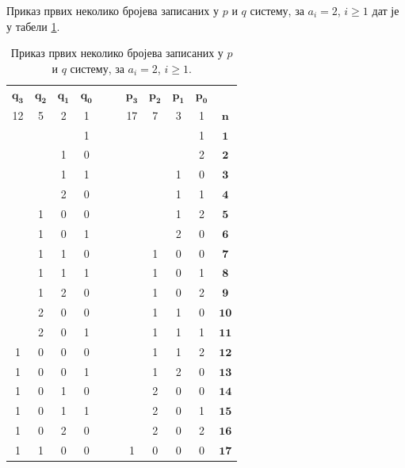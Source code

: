 \documentclass[a4paper]{article}
\begin{document}
Приказ првих неколико бројева записаних у $ p $ и $ q $ систему, за $ a_{i} = 2 $, $ i \ge 1 $ дат је у табели \ref{tab:p_q_sistem}.

\begin{table}[h!]
	\caption{Приказ првих неколико бројева записаних у $ p $ и $ q $ систему, за $ a_{i} = 2 $, $ i \ge 1 $.}
	\label{tab:p_q_sistem}
	\begin{center}
		\begin{tabular}{ | c | c | c | c | c  c | c | c | c | c | c |}
			\hline
			{$ \mathbf{q_{3}} $} &  {$ \mathbf{q_{2}} $} &  {$ \mathbf{q_{1}} $} &  {$ \mathbf{q_{0}} $} & & &  {$ \mathbf{p_{3}} $} &  {$ \mathbf{p_{2}} $} &  {$ \mathbf{p_{1}} $} &  {$ \mathbf{p_{0}} $} &\\
			12 & 5 & 2 & 1 & & & 17 & 7 & 3 & 1 &  {$ \mathbf{n} $}\\
			\hline
			&  &  & 1 & & &  &  &  & 1 & {$ \mathbf{1} $}\\
			&  & 1 & 0 & & &  &  &  & 2 & {$ \mathbf{2} $}\\
			&  & 1 & 1 & & &  &  & 1 & 0 &  {$ \mathbf{3} $}\\
			&  & 2 & 0 & & &  &  & 1 & 1 &  {$ \mathbf{4} $}\\
			& 1 & 0 & 0 & & &  &  & 1 & 2 &  {$ \mathbf{5} $}\\
			& 1 & 0 & 1 & & &  &  & 2 & 0 &  {$ \mathbf{6} $}\\
			& 1 & 1 & 0 & & &  & 1 & 0 & 0 &  {$ \mathbf{7} $}\\
			& 1 & 1 & 1 & & &  & 1 & 0 & 1 &  {$ \mathbf{8} $}\\
			& 1 & 2 & 0 & & &  & 1 & 0 & 2 &  {$ \mathbf{9} $}\\
			& 2 & 0 & 0 & & &  & 1 & 1 & 0 &  {$ \mathbf{10} $}\\
			& 2 & 0 & 1 & & &  & 1 & 1 & 1 &  {$ \mathbf{11} $}\\
			 1 & 0 & 0 & 0 & & & & 1 & 1 & 2 &  {$ \mathbf{12} $}\\
			 1 & 0 & 0 & 1 & & & & 1 & 2 & 0 &  {$ \mathbf{13} $}\\
			 1 & 0 & 1 & 0 & & & & 2 & 0 & 0 &  {$ \mathbf{14} $}\\
			 1 & 0 & 1 & 1 & & & & 2 & 0 & 1 &  {$ \mathbf{15} $}\\
			 1 & 0 & 2 & 0 & & & & 2 & 0 & 2 &  {$ \mathbf{16} $}\\
			 1 & 1 & 0 & 0 & & & 1 & 0 & 0 & 0 &  {$ \mathbf{17} $}\\
			\hline 
		\end{tabular}
	\end{center}
\end{table}
\end{document}
